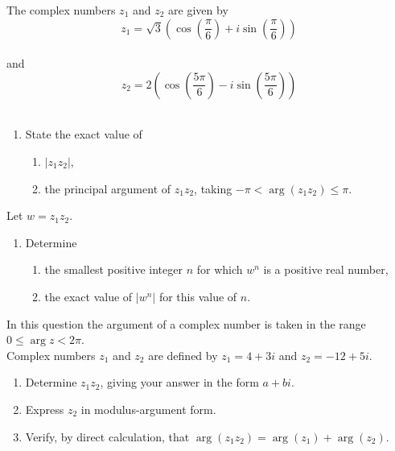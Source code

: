 \documentclass[leqno]{article}
\begin{document}
\begin{enumerate}[
  label=\textbf{\arabic*.},
  leftmargin=*,
  topsep=0pt,
  partopsep=0pt,
  parsep=0pt
]
The complex numbers $z_1$ and $z_2$ are given by
\[
z_1=\sqrt{3}\left(\cos\left(\frac{\pi}{6}\right)+i\sin\left(\frac{\pi}{6}\right)\right)
\] \\
and
\[
z_2=2\left(\cos\left(\frac{5\pi}{6}\right)-i\sin\left(\frac{5\pi}{6}\right)\right)
\] \\
\begin{enumerate}[label=\textbf{(\alph*)}]
\item State the exact value of
\begin{enumerate}[label=(\roman*)]
\item $|z_1z_2|$,
\item the principal argument of $z_1z_2$, taking $-\pi<\arg(z_1z_2)\leq\pi$.
\end{enumerate}
\end{enumerate}
Let $w=z_1z_2$. \\
\begin{enumerate}[label=\textbf{(\alph*)}, resume]
\item Determine
\begin{enumerate}[label=(\roman*)]
\item the smallest positive integer $n$ for which $w^n$ is a positive real number,
\item the exact value of $|w^n|$ for this value of $n$.
\end{enumerate}
\end{enumerate}

\newpage

\questionitem

In this question the argument of a complex number is taken in the range $0\leq\arg z<2\pi$. \\
Complex numbers $z_1$ and $z_2$ are defined by $z_1=4+3i$ and $z_2=-12+5i$. \\
\begin{enumerate}[label=\textbf{(\alph*)}]
\item Determine $z_1z_2$, giving your answer in the form $a+bi$.  \\
\item Express $z_2$ in modulus-argument form.  \\
\item Verify, by direct calculation, that $\arg(z_1z_2)=\arg(z_1)+\arg(z_2)$.  \\
\end{enumerate}

\newpage


\end{enumerate}
\end{document}
